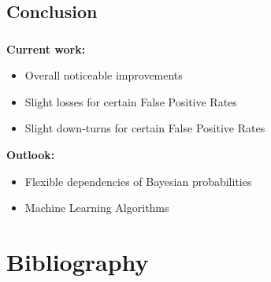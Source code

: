 \documentclass{beamer}
\begin{document}
\subsection{Conclusion}
\begin{frame}
	\frametitle{\insertsection}
	\framesubtitle{\insertsubsection}

	\textbf{Current work:}\\
	\begin{itemize}
		\item Overall noticeable improvements
		\item Slight losses for certain False Positive Rates
		\item Slight down-turns for certain False Positive Rates
	\end{itemize}

	\vspace{2em}
	\textbf{Outlook:}\\
	\begin{itemize}
		\item Flexible dependencies of Bayesian probabilities
		\item Machine Learning Algorithms
	\end{itemize}
\end{frame}

\section*{Bibliography}
\begin{frame}
	\frametitle{\insertsection}

	\printbibliography
\end{frame}
\end{document}

